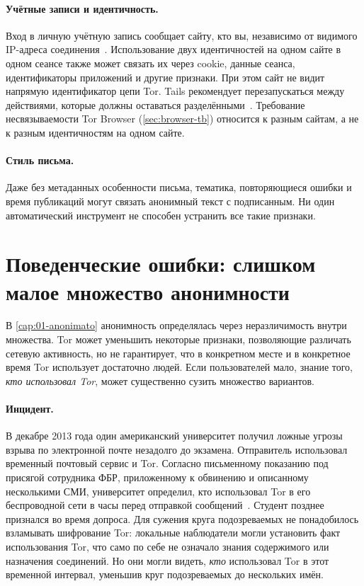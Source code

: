 \paragraph{Учётные записи и идентичность.} Вход в личную учётную запись сообщает сайту, кто вы, независимо от видимого IP-адреса соединения~\cite{torsafety}. Использование двух идентичностей на одном сайте в одном сеансе также может связать их через cookie, данные сеанса, идентификаторы приложений и другие признаки. При этом сайт не видит напрямую идентификатор цепи Tor. Tails рекомендует перезапускаться между действиями, которые должны оставаться разделёнными~\cite{tailswarnings}. Требование несвязываемости Tor Browser (\cref{sec:browser-tb}) относится к разным сайтам, а не к разным идентичностям на одном сайте.

\paragraph{Стиль письма.} Даже без метаданных особенности письма, тематика, повторяющиеся ошибки и время публикаций могут связать анонимный текст с подписанным. Ни один автоматический инструмент не способен устранить все такие признаки.

\section{Поведенческие ошибки: слишком малое множество анонимности}\label{sec:opsec-insieme}

В \cref{cap:01-anonimato} анонимность определялась через неразличимость внутри множества. Tor может уменьшить некоторые признаки, позволяющие различать сетевую активность, но не гарантирует, что в конкретном месте и в конкретное время Tor использует достаточно людей. Если пользователей мало, знание того, \emph{кто использовал Tor}, может существенно сузить множество вариантов.

\paragraph{Инцидент.} В декабре 2013 года один американский университет получил ложные угрозы взрыва по электронной почте незадолго до экзамена. Отправитель использовал временный почтовый сервис и Tor. Согласно письменному показанию под присягой сотрудника ФБР, приложенному к обвинению и описанному несколькими СМИ, университет определил, кто использовал Tor в его беспроводной сети в часы перед отправкой сообщений~\cite{wbur2013harvard,sandvik2013harvard}. Студент позднее признался во время допроса. Для сужения круга подозреваемых не понадобилось взламывать шифрование Tor: локальные наблюдатели могли установить факт использования Tor, что само по себе не означало знания содержимого или назначения соединений. Но они могли видеть, \emph{кто} использовал Tor в этот временной интервал, уменьшив круг подозреваемых до нескольких имён.

